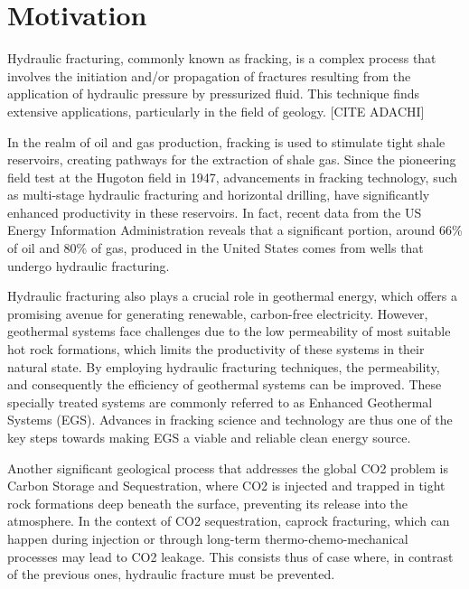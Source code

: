 \section{Motivation}

Hydraulic fracturing, commonly known as fracking, is a complex process that involves the initiation and/or propagation of fractures resulting from the application of hydraulic pressure by pressurized fluid. This technique finds extensive applications, particularly in the field of geology. [CITE ADACHI]

In the realm of oil and gas production, fracking is used to stimulate tight shale reservoirs, creating pathways for the extraction of shale gas. Since the pioneering field test at the Hugoton field in 1947, advancements in fracking technology, such as multi-stage hydraulic fracturing and horizontal drilling, have significantly enhanced productivity in these reservoirs. In fact, recent data from the US Energy Information Administration reveals that a significant portion, around 66\% of oil and 80\% of gas, produced in the United States comes from wells that undergo hydraulic fracturing.



Hydraulic fracturing also plays a crucial role in geothermal energy, which offers a promising avenue for generating renewable, carbon-free electricity. However, geothermal systems face challenges due to the low permeability of most suitable hot rock formations, which limits the productivity of these systems in their natural state. By employing hydraulic fracturing techniques, the permeability, and consequently the efficiency of geothermal systems can be improved. These specially treated systems are commonly referred to as Enhanced Geothermal Systems (EGS). Advances in fracking science and technology are thus one of the key steps towards making EGS a viable and reliable clean energy source.

Another significant geological process that addresses the global CO2 problem is Carbon Storage and Sequestration, where CO2 is injected and trapped in tight rock formations deep beneath the surface, preventing its release into the atmosphere. In the context of CO2 sequestration, caprock fracturing, which can happen during injection or through long-term thermo-chemo-mechanical processes may lead to CO2 leakage. This consists thus of case where, in contrast of the previous ones, hydraulic fracture must be prevented.

